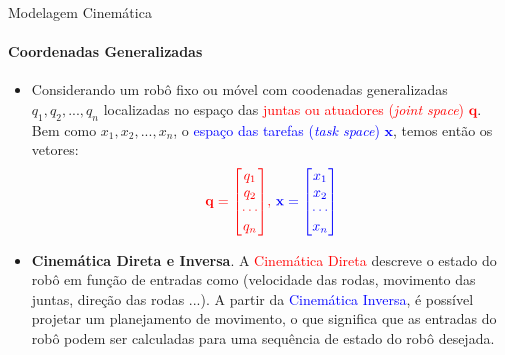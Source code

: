 \documentclass{beamer}
\begin{document}
\begin{frame}{Modelagem Cinemática}
    \framesubtitle{Coordenadas Generalizadas}
    \begin{itemize}
        \item Considerando um robô fixo ou móvel com coodenadas generalizadas $q_1, q_2,..., q_n$ localizadas no espaço das \textcolor{red}{juntas ou atuadores (\textit{joint space}) $\mathbf{q}$}. Bem como $x_1, x_2,..., x_n$, o \textcolor{blue}{espaço das tarefas (\textit{task space}) $\mathbf{x}$}, temos então os vetores:
             \begin{equation*}
                \color{red}{
                  \mathbf{q} =
                  \begin{bmatrix}
                      q_1 \\q_2 \\ \cdots  \\ q_n
                  \end{bmatrix}
                }
                  \text{, }
                \color{blue}{
                  \mathbf{x} =
                  \begin{bmatrix}
                      x_1 \\x_2 \\ \cdots \\ x_n
                  \end{bmatrix}
                }
              \end{equation*}

        \item \textbf{Cinemática Direta e Inversa}. A \textcolor{red}{Cinemática Direta} descreve o estado do robô em função de entradas como (velocidade das rodas, movimento das juntas, direção das rodas ...).  A partir da \textcolor{blue}{Cinemática Inversa}, é possível projetar um planejamento de movimento, o que significa que as entradas do robô podem ser calculadas para uma sequência de estado do robô desejada.

    \end{itemize}
\end{frame}
\end{document}

